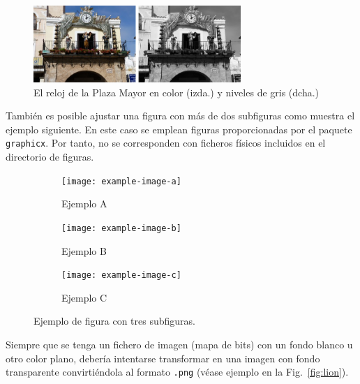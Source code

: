 \documentclass[11pt,a4paper]{article}
\begin{document}
\begin{figure}[H]
	\centering
		\includegraphics[width=0.7\textwidth]{../figs/2clockCR}
		\caption[Varias imágenes como una]{El reloj de la Plaza Mayor en color (izda.) y niveles de gris (dcha.)}
	\label{fig:2clock}
\end{figure}

También es posible ajustar una figura con más de dos subfiguras como muestra el ejemplo siguiente. En este caso se emplean figuras proporcionadas por el paquete \texttt{graphicx}. Por tanto, no se corresponden con ficheros físicos incluidos en el directorio de figuras.

\begin{figure}[H]
     \centering
     \begin{subfigure}[b]{0.3\textwidth}
         \centering
         \texttt{[image: example-image-a]}
         \caption{Ejemplo A}
         \label{fig:ejA}
     \end{subfigure}
     \hfill
     \begin{subfigure}[b]{0.3\textwidth}
         \centering
         \texttt{[image: example-image-b]}
         \caption{Ejemplo B}
         \label{fig:ejB}
     \end{subfigure}     
     \hfill
     \begin{subfigure}[b]{0.3\textwidth}
         \centering
         \texttt{[image: example-image-c]}
         \caption{Ejemplo C}
         \label{fig:EjC}
     \end{subfigure}
        \caption{Ejemplo de figura con tres subfiguras.}
        \label{fig:ej3figs}
\end{figure}

Siempre que se tenga un fichero de imagen (mapa de bits) con un fondo blanco u otro color plano, debería intentarse transformar en una imagen con fondo transparente convirtiéndola al formato \texttt{.png} (véase ejemplo en la Fig.~\ref{fig:lion}).
\end{document}
